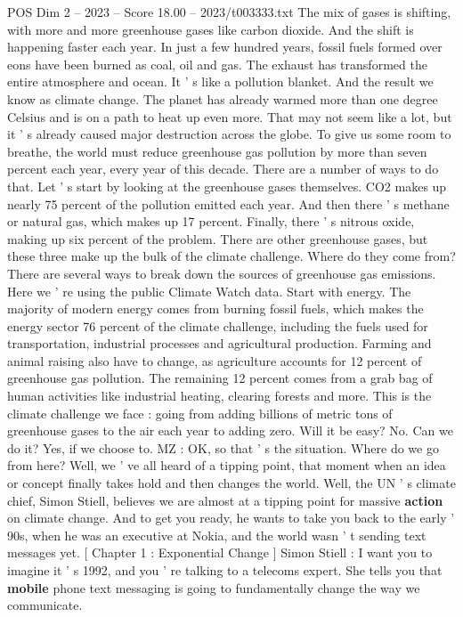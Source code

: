 \begin{textsample}{POS Dim 2 – 2023 – Score 18.00 – 2023/t003333.txt}
The mix of gases is shifting, with more and more greenhouse gases like carbon dioxide.
And the shift is happening faster each year.
In just a few hundred years, fossil fuels formed over eons have been burned as coal, oil and gas.
The exhaust has transformed the entire atmosphere and ocean.
It ' s like a pollution blanket.
And the result we know as climate change.
The planet has already warmed more than one degree Celsius and is on a path to heat up even more.
That may not seem like a lot, but it ' s already caused major destruction across the globe.
To give us some room to breathe, the world must reduce greenhouse gas pollution by more than seven percent each year, every year of this decade.
There are a number of ways to do that.
Let ' s start by looking at the greenhouse gases themselves.
CO2 makes up nearly 75 percent of the pollution emitted each year.
And then there ' s methane or natural gas, which makes up 17 percent.
Finally, there ' s nitrous oxide, making up six percent of the problem.
There are other greenhouse gases, but these three make up the bulk of the climate challenge.
Where do they come from?
There are several ways to break down the sources of greenhouse gas emissions.
Here we ' re using the public Climate Watch data.
Start with energy.
The majority of modern energy comes from burning fossil fuels, which makes the energy sector 76 percent of the climate challenge, including the fuels used for transportation, industrial processes and agricultural production.
Farming and animal raising also have to change, as agriculture accounts for 12 percent of greenhouse gas pollution.
The remaining 12 percent comes from a grab bag of human activities like industrial heating, clearing forests and more.
This is the climate challenge we face : going from adding billions of metric tons of greenhouse gases to the air each year to adding zero.
Will it be easy?
No.
Can we do it?
Yes, if we choose to.
MZ : OK, so that ' s the situation.
Where do we go from here?
Well, we ' ve all heard of a tipping point, that moment when an idea or concept finally takes hold and then changes the world.
Well, the UN ' s climate chief, Simon Stiell, believes we are almost at a tipping point for massive \textbf{action} on climate change.
And to get you ready, he wants to take you back to the early ' 90s, when he was an executive at Nokia, and the world wasn ' t sending text messages yet. [ Chapter 1 : Exponential Change ] Simon Stiell : I want you to imagine it ' s 1992, and you ' re talking to a telecoms expert.
She tells you that \textbf{mobile} phone text messaging is going to fundamentally change the way we communicate.

\end{textsample}
